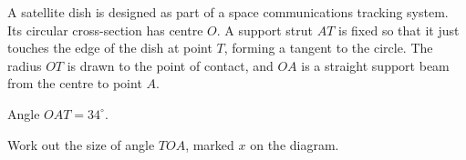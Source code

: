 \documentclass[11pt]{article}
\begin{document}
\begin{question}
\noindent A satellite dish is designed as part of a space communications tracking system. Its circular cross-section has centre $O$. A support strut $AT$ is fixed so that it just touches the edge of the dish at point $T$, forming a tangent to the circle. The radius $OT$ is drawn to the point of contact, and $OA$ is a straight support beam from the centre to point $A$.

Angle $OAT = 34^\circ$.

\begin{center}
\end{center}

\noindent Work out the size of angle $TOA$, marked $x$ on the diagram.

\vspace{4cm}

\begin{flushright}
\end{flushright}
\end{question}
\end{document}
